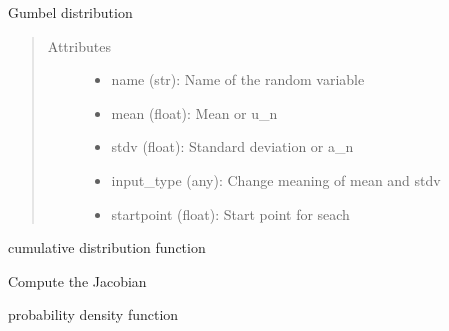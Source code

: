 \documentclass[letterpaper,10pt,english]{sphinxmanual}
\begin{document}
\begin{fulllineitems}
Gumbel distribution
\begin{quote}\begin{description}
\item[{Attributes }] \leavevmode\begin{itemize}
\item {} 
name (str):   Name of the random variable

\item {} 
mean (float): Mean or u\_n

\item {} 
stdv (float): Standard deviation or a\_n

\item {} 
input\_type (any): Change meaning of mean and stdv

\item {} 
startpoint (float): Start point for seach

\end{itemize}

\end{description}\end{quote}


\begin{fulllineitems}
cumulative distribution function

\end{fulllineitems}



\begin{fulllineitems}
Compute the Jacobian

\end{fulllineitems}



\begin{fulllineitems}
probability density function

\end{fulllineitems}




\end{fulllineitems}
\end{document}
